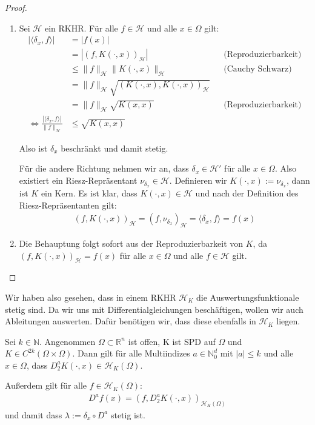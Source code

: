 \begin{proof}
\begin{enumerate}
\item 
Sei $\mathcal{H}$ ein \ac{RKHR}. Für alle $f \in \mathcal{H}$ und alle $x \in \Omega$ gilt:
\begin{align*}
|\langle \delta_x,f \rangle | &= |f(x)|\\ 
&= |(f, K(\cdot,x))_\mathcal{H}| &&\text{(Reproduzierbarkeit)}\\
&\le \|f\|_\mathcal{H}\|K(\cdot,x)\|_\mathcal{H} &&\text{(Cauchy Schwarz)}\\
&= \|f\|_\mathcal{H} \sqrt{(K(\cdot,x),K(\cdot,x))_\mathcal{H}}\\
&= \|f\|_\mathcal{H} \sqrt{K(x,x)} &&\text{(Reproduzierbarkeit)}\\
\Leftrightarrow \frac{|\langle \delta_x,f \rangle|}{\|f\|_\mathcal{H}} &\le \sqrt{K(x,x)}
\end{align*}

Also ist $\delta_x$ beschränkt und damit stetig.

Für die andere Richtung nehmen wir an, dass $\delta_x  \in \mathcal{H}'$ für alle $x \in \Omega$. Also existiert ein Riesz-Repräsentant $\nu_{\delta_x} \in \mathcal{H}$. Definieren wir $K(\cdot,x):= \nu_{\delta_x}$, dann ist $K$ ein Kern. Es ist klar, dass $K(\cdot,x) \in \mathcal{H}$ und nach der Definition des Riesz-Repräsentanten gilt:
\begin{align*}
(f, K(\cdot,x))_\mathcal{H} = (f, \nu_{\delta_x})_\mathcal{H} = \langle \delta_x,f \rangle = f(x)
\end{align*}
\item Die Behauptung folgt sofort aus der Reproduzierbarkeit von $K$, da $(f, K(\cdot,x))_\mathcal{H}= f(x)$ für alle $x \in \Omega$ und alle $f \in \mathcal{H}$ gilt.
\end{enumerate}
\end{proof}

Wir haben also gesehen, dass in einem \ac{RKHR} $\mathcal{H}_K$ die Auswertungsfunktionale stetig sind. Da wir uns mit Differentialgleichungen beschäftigen, wollen wir auch Ableitungen auswerten. Dafür benötigen wir, dass diese ebenfalls in $\mathcal{H}_K$ liegen.

\begin{theorem}
Sei $k \in \mathbb{N}$. Angenommen $\Omega \subset \mathbb{R}^n$ ist offen, K ist \ac{SPD} auf $\Omega$ und $K \in C^{2k}(\Omega \times \Omega)$. Dann gilt für alle Multiindizes $a \in \mathbb{N}_0^d$ mit $|a| \le k$ und alle $x \in \Omega$, dass $D_2^a K(\cdot , x) \in \mathcal{H}_K(\Omega)$.

Außerdem gilt für alle $f \in \mathcal{H}_K(\Omega)$:
\begin{align*}
D^a f(x) = \left(f,D_2^a K(\cdot,x)\right)_{\mathcal{H}_K(\Omega)}
\end{align*}
und damit dass $\lambda := \delta_x \circ D^a$ stetig ist.
\end{theorem}

